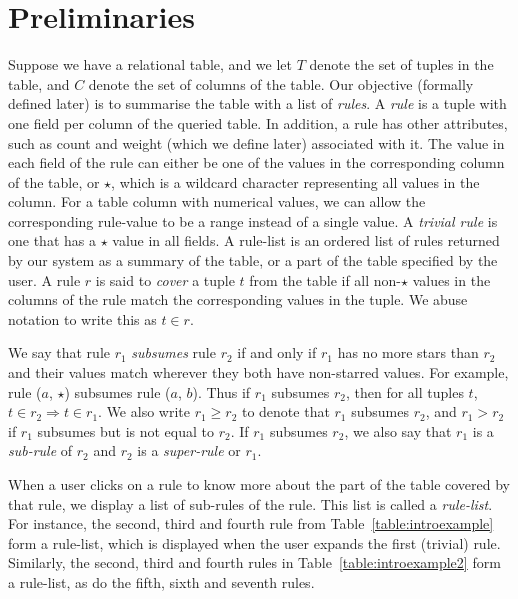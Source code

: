 \documentclass{sig-alternate}
\begin{document}
\section{Preliminaries} 
\label{sec:preliminaries}
Suppose we have a relational table, and we let $T$ denote the set of tuples in the table, and $C$ denote the set of columns of the table. Our objective (formally defined later) is to summarise the table with a list of {\em rules}. A {\em rule} is a tuple with one field per column of the queried table. In addition, a rule has other attributes, such as count and weight (which we define later) associated with it. The value in each field of the rule can either be one of the values in the corresponding column of the table, or $\star$, which is a wildcard character representing all values in the column. For a table column with numerical values, we can allow the corresponding rule-value to be a range instead of a single value. A {\em trivial rule} is one that has a $\star$ value in all fields. A rule-list is an ordered list of rules returned by our system as a summary of the table, or a part of the table specified by the user. A rule $r$ is said to {\em cover} a tuple  $t$ from the table if all non-$\star$ values in the columns of the rule match the corresponding values in the tuple. We abuse notation to write this as $t \in r$.

We say that rule $r_1$ {\em subsumes} rule $r_2$ if and only if $r_1$ has no more stars than $r_2$ and their values match wherever they both have non-starred values. For example, rule ($a$, $\star$) subsumes rule ($a$, $b$). Thus if $r_1$ subsumes $r_2$, then for all tuples $t$, $t \in r_2 \Rightarrow t \in r_1$. We also write $r_1 \geq r_2$ to denote that $r_1$ subsumes $r_2$, and $r_1 > r_2$ if $r_1$ subsumes but is not equal to $r_2$. If $r_1$ subsumes $r_2$, we also say that $r_1$ is a {\em sub-rule} of $r_2$ and $r_2$ is a {\em super-rule} or $r_1$.

When a user clicks on a rule to know more about the part of the table covered by that rule, we display a list of sub-rules of the rule. This list is called a {\em rule-list}.
For instance, the second, third and fourth rule from Table~\ref{table:introexample} form a rule-list, which is displayed when the user expands the first (trivial) rule. Similarly, the second, third and fourth rules in Table~\ref{table:introexample2} form a rule-list, as do the fifth, sixth and seventh rules. 
\end{document}
